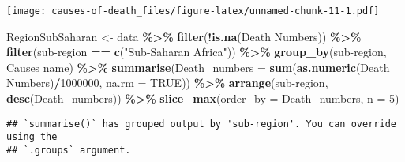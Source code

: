 \documentclass[
]{article}
\newenvironment{Shaded}{\begin{snugshade}}{\end{snugshade}}
\newcommand{\AttributeTok}[1]{\textcolor[rgb]{0.13,0.29,0.53}{#1}}
\newcommand{\ConstantTok}[1]{\textcolor[rgb]{0.56,0.35,0.01}{#1}}
\newcommand{\DecValTok}[1]{\textcolor[rgb]{0.00,0.00,0.81}{#1}}
\newcommand{\FunctionTok}[1]{\textcolor[rgb]{0.13,0.29,0.53}{\textbf{#1}}}
\newcommand{\NormalTok}[1]{#1}
\newcommand{\OtherTok}[1]{\textcolor[rgb]{0.56,0.35,0.01}{#1}}
\newcommand{\SpecialCharTok}[1]{\textcolor[rgb]{0.81,0.36,0.00}{\textbf{#1}}}
\newcommand{\StringTok}[1]{\textcolor[rgb]{0.31,0.60,0.02}{#1}}
\begin{document}
\texttt{[image: causes-of-death\_files/figure-latex/unnamed-chunk-11-1.pdf]}

\begin{Shaded}
\begin{Highlighting}[]
\NormalTok{RegionSubSaharan }\OtherTok{\textless{}{-}}\NormalTok{ data }\SpecialCharTok{\%\textgreater{}\%}
  \FunctionTok{filter}\NormalTok{(}\SpecialCharTok{!}\FunctionTok{is.na}\NormalTok{(}\StringTok{\textasciigrave{}}\AttributeTok{Death Numbers}\StringTok{\textasciigrave{}}\NormalTok{)) }\SpecialCharTok{\%\textgreater{}\%}
  \FunctionTok{filter}\NormalTok{(}\StringTok{\textasciigrave{}}\AttributeTok{sub{-}region}\StringTok{\textasciigrave{}} \SpecialCharTok{==} \FunctionTok{c}\NormalTok{(}\StringTok{"Sub{-}Saharan Africa"}\NormalTok{)) }\SpecialCharTok{\%\textgreater{}\%}
  \FunctionTok{group\_by}\NormalTok{(}\StringTok{\textasciigrave{}}\AttributeTok{sub{-}region}\StringTok{\textasciigrave{}}\NormalTok{, }\StringTok{\textasciigrave{}}\AttributeTok{Causes name}\StringTok{\textasciigrave{}}\NormalTok{) }\SpecialCharTok{\%\textgreater{}\%}
  \FunctionTok{summarise}\NormalTok{(}\AttributeTok{Death\_numbers =} \FunctionTok{sum}\NormalTok{(}\FunctionTok{as.numeric}\NormalTok{(}\StringTok{\textasciigrave{}}\AttributeTok{Death Numbers}\StringTok{\textasciigrave{}}\NormalTok{)}\SpecialCharTok{/}\DecValTok{1000000}\NormalTok{, }\AttributeTok{na.rm =} \ConstantTok{TRUE}\NormalTok{)) }\SpecialCharTok{\%\textgreater{}\%}
  \FunctionTok{arrange}\NormalTok{(}\StringTok{\textasciigrave{}}\AttributeTok{sub{-}region}\StringTok{\textasciigrave{}}\NormalTok{, }\FunctionTok{desc}\NormalTok{(Death\_numbers)) }\SpecialCharTok{\%\textgreater{}\%}
  \FunctionTok{slice\_max}\NormalTok{(}\AttributeTok{order\_by =}\NormalTok{ Death\_numbers, }\AttributeTok{n =} \DecValTok{5}\NormalTok{)}
\end{Highlighting}
\end{Shaded}

\begin{verbatim}
## `summarise()` has grouped output by 'sub-region'. You can override using the
## `.groups` argument.
\end{verbatim}
\end{document}
